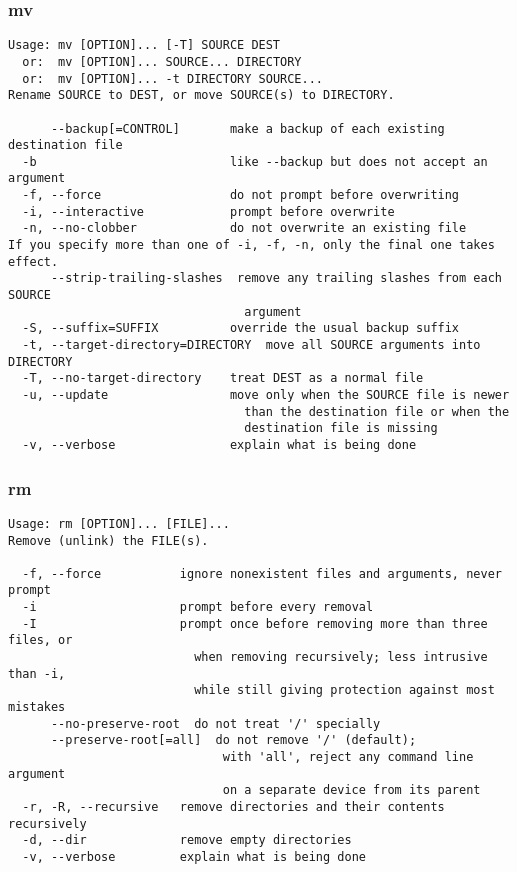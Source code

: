 \documentclass[11pt,a4paper]{article}
\newcommand{\cmd}[1]{
  \subsubsection*{#1}
  \addcontentsline{toc}{subsection}{#1}
}
\begin{document}
\cmd{mv}
\begin{verbatim}
Usage: mv [OPTION]... [-T] SOURCE DEST
  or:  mv [OPTION]... SOURCE... DIRECTORY
  or:  mv [OPTION]... -t DIRECTORY SOURCE...
Rename SOURCE to DEST, or move SOURCE(s) to DIRECTORY.
  
      --backup[=CONTROL]       make a backup of each existing destination file
  -b                           like --backup but does not accept an argument
  -f, --force                  do not prompt before overwriting
  -i, --interactive            prompt before overwrite
  -n, --no-clobber             do not overwrite an existing file
If you specify more than one of -i, -f, -n, only the final one takes effect.
      --strip-trailing-slashes  remove any trailing slashes from each SOURCE
                                 argument
  -S, --suffix=SUFFIX          override the usual backup suffix
  -t, --target-directory=DIRECTORY  move all SOURCE arguments into DIRECTORY
  -T, --no-target-directory    treat DEST as a normal file
  -u, --update                 move only when the SOURCE file is newer
                                 than the destination file or when the
                                 destination file is missing
  -v, --verbose                explain what is being done
\end{verbatim}

\cmd{rm}
\begin{verbatim}
Usage: rm [OPTION]... [FILE]...
Remove (unlink) the FILE(s).

  -f, --force           ignore nonexistent files and arguments, never prompt
  -i                    prompt before every removal
  -I                    prompt once before removing more than three files, or
                          when removing recursively; less intrusive than -i,
                          while still giving protection against most mistakes
      --no-preserve-root  do not treat '/' specially
      --preserve-root[=all]  do not remove '/' (default);
                              with 'all', reject any command line argument
                              on a separate device from its parent
  -r, -R, --recursive   remove directories and their contents recursively
  -d, --dir             remove empty directories
  -v, --verbose         explain what is being done
\end{verbatim}
\end{document}
